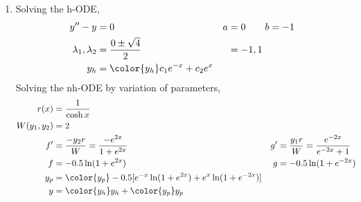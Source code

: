 \begin{enumerate}
    \item Solving the h-ODE,
          \begin{align}
              y'' - y                  & = 0                                      & a & = 0 \qquad b = -1 \\
              \lambda_{1}, \lambda_{2} & = \frac{0 \pm \sqrt{4}}{2}               &   & = -1, 1           \\
              y_{h}                    & = {\color{y_h} c_{1}e^{-x} + c_{2}e^{x}}
          \end{align}
          Solving the nh-ODE by variation of parameters,
          \begin{align}
              r(x)            & = \frac{1}{\cosh x}                                                                                                         \\
              W(y_{1}, y_{2}) & = 2                                                                                                                         \\
              f'              & = \frac{-y_{2}r}{W} = \frac{-e^{2x}}{1 + e^{2x}}                    & g' & = \frac{y_{1}r}{W} = \frac{e^{-2x}}{e^{-2x} + 1} \\
              f               & = -0.5\ln (1 + e^{2x})                                              & g  & = -0.5\ln(1 + e^{-2x})                           \\
              y_{p}           & = {\color{y_p} -0.5[e^{-x}\ln(1 + e^{2x}) + e^{x}\ln(1 + e^{-2x})]}                                                         \\
              y               & = {\color{y_h} y_{h}} + {\color{y_p} y_{p}}
          \end{align}


\end{enumerate}

